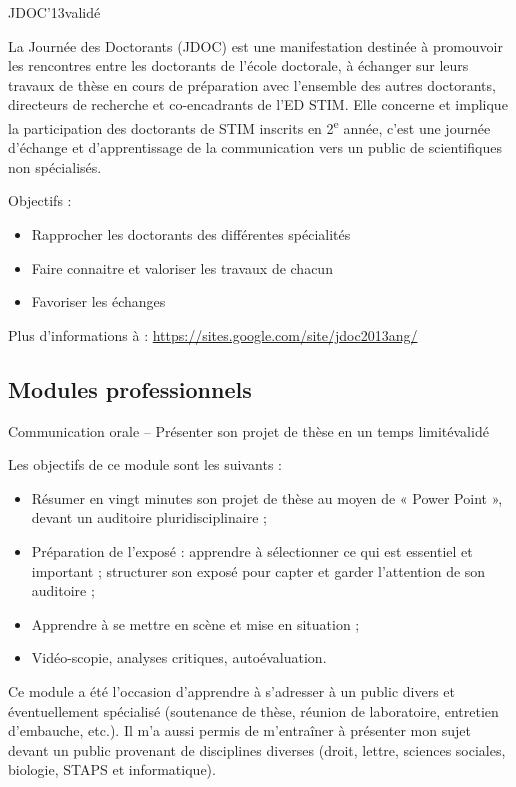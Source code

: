 \formation
{JDOC'13}{validé}
{La Journée des Doctorants (JDOC) est une manifestation destinée à promouvoir les rencontres entre les doctorants de l'école doctorale, à échanger sur leurs travaux de thèse en cours de préparation avec l'ensemble des autres doctorants, directeurs de recherche et co-encadrants de l'ED STIM. Elle concerne et implique la participation des doctorants de STIM inscrits en 2\textsuperscript{e} année, c'est une journée d'échange et d'apprentissage de la communication vers un public de scientifiques non spécialisés.

Objectifs :
\begin{itemize}
  \item Rapprocher les doctorants des différentes spécialités
  \item Faire connaitre et valoriser les travaux de chacun
  \item Favoriser les échanges
\end{itemize}

Plus d'informations à : \url{https://sites.google.com/site/jdoc2013ang/}}



\subsection{Modules professionnels}

\formation
{Communication orale -- Présenter son projet de thèse en un temps limité}{validé}
{Les objectifs de ce module sont les suivants :
\begin{itemize}
  \item Résumer en vingt minutes son projet de thèse au moyen de « Power Point », devant un auditoire pluridisciplinaire ;
  \item Préparation de l'exposé : apprendre à sélectionner ce qui est essentiel et important ; structurer son exposé pour capter et garder l'attention de son auditoire ;
  \item Apprendre à se mettre en scène et mise en situation ;
  \item Vidéo-scopie, analyses critiques, autoévaluation.
\end{itemize}

Ce module a été l'occasion d'apprendre à s'adresser à un public divers et éventuellement spécialisé (soutenance de thèse, réunion de laboratoire, entretien d'embauche, etc.).
Il m'a aussi permis de m'entraîner à présenter mon sujet devant un public provenant de disciplines diverses (droit, lettre, sciences sociales, biologie, STAPS et informatique).}

